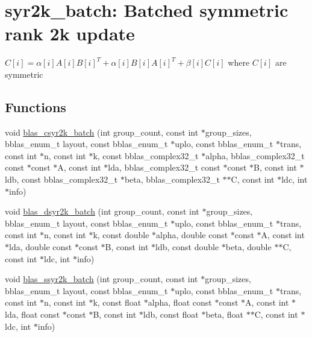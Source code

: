 \hypertarget{group__syr2k__batch}{}\section{syr2k\+\_\+batch\+: Batched symmetric rank 2k update}
\label{group__syr2k__batch}


$ C[i] = \alpha[i] A[i] B[i]^T + \alpha[i] B[i] A[i]^T + \beta[i] C[i] $ where $ C[i] $ are symmetric  


\subsection*{Functions}
\begin{DoxyCompactItemize}
\item 
void \hyperlink{group__syr2k__batch_ga8dff27bde64036cc0861a200e82764c1}{blas\+\_\+csyr2k\+\_\+batch} (int group\+\_\+count, const int $\ast$group\+\_\+sizes, bblas\+\_\+enum\+\_\+t layout, const bblas\+\_\+enum\+\_\+t $\ast$uplo, const bblas\+\_\+enum\+\_\+t $\ast$trans, const int $\ast$n, const int $\ast$k, const bblas\+\_\+complex32\+\_\+t $\ast$alpha, bblas\+\_\+complex32\+\_\+t const $\ast$const $\ast$A, const int $\ast$lda, bblas\+\_\+complex32\+\_\+t const $\ast$const $\ast$B, const int $\ast$ldb, const bblas\+\_\+complex32\+\_\+t $\ast$beta, bblas\+\_\+complex32\+\_\+t $\ast$$\ast$C, const int $\ast$ldc, int $\ast$info)
\item 
void \hyperlink{group__syr2k__batch_ga92363ade2cc637cbb79d139085ac715f}{blas\+\_\+dsyr2k\+\_\+batch} (int group\+\_\+count, const int $\ast$group\+\_\+sizes, bblas\+\_\+enum\+\_\+t layout, const bblas\+\_\+enum\+\_\+t $\ast$uplo, const bblas\+\_\+enum\+\_\+t $\ast$trans, const int $\ast$n, const int $\ast$k, const double $\ast$alpha, double const $\ast$const $\ast$A, const int $\ast$lda, double const $\ast$const $\ast$B, const int $\ast$ldb, const double $\ast$beta, double $\ast$$\ast$C, const int $\ast$ldc, int $\ast$info)
\item 
void \hyperlink{group__syr2k__batch_ga644c1621654e2a6df012fc6d50cdcac7}{blas\+\_\+ssyr2k\+\_\+batch} (int group\+\_\+count, const int $\ast$group\+\_\+sizes, bblas\+\_\+enum\+\_\+t layout, const bblas\+\_\+enum\+\_\+t $\ast$uplo, const bblas\+\_\+enum\+\_\+t $\ast$trans, const int $\ast$n, const int $\ast$k, const float $\ast$alpha, float const $\ast$const $\ast$A, const int $\ast$lda, float const $\ast$const $\ast$B, const int $\ast$ldb, const float $\ast$beta, float $\ast$$\ast$C, const int $\ast$ldc, int $\ast$info)
$$
\end{DoxyCompactItemize}
